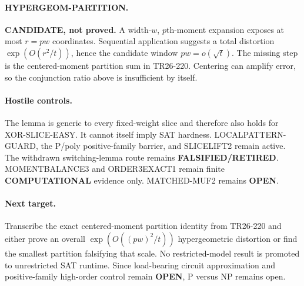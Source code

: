 \documentclass{article}
\begin{document}
\paragraph{HYPERGEOM-PARTITION.}
\textbf{CANDIDATE, not proved.}
A width-$w$, $p$th-moment expansion exposes at most $r=pw$ coordinates. Sequential application suggests a total distortion $\exp(O(r^2/t))$, hence the candidate window $pw=o(\sqrt t)$. The missing step is the centered-moment partition sum in TR26-220. Centering can amplify error, so the conjunction ratio above is insufficient by itself.

\paragraph{Hostile controls.}
The lemma is generic to every fixed-weight slice and therefore also holds for XOR-SLICE-EASY. It cannot itself imply SAT hardness. LOCALPATTERN-GUARD, the P/poly positive-family barrier, and SLICELIFT2 remain active. The withdrawn switching-lemma route remains \textbf{FALSIFIED/RETIRED}. MOMENTBALANCE3 and ORDER3EXACT1 remain finite \textbf{COMPUTATIONAL} evidence only. MATCHED-MUF2 remains \textbf{OPEN}.

\paragraph{Next target.}
Transcribe the exact centered-moment partition identity from TR26-220 and either prove an overall $\exp(O((pw)^2/t))$ hypergeometric distortion or find the smallest partition falsifying that scale. No restricted-model result is promoted to unrestricted SAT runtime. Since load-bearing circuit approximation and positive-family high-order control remain \textbf{OPEN}, P versus NP remains open.

\end{document}
